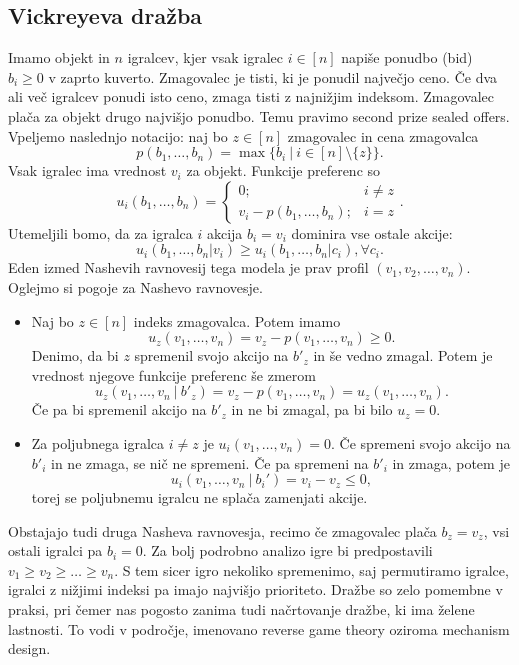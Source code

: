 \documentclass[10pt, a4paper]{article}
\begin{document}
\subsection{Vickreyeva dražba}

Imamo objekt in $n$ igralcev, kjer vsak igralec $i \in [n]$ napiše ponudbo (bid) $b_i \geq 0$ v zaprto kuverto.
Zmagovalec je tisti, ki je ponudil največjo ceno. Če dva ali več igralcev ponudi isto ceno, zmaga tisti z najnižjim 
indeksom. Zmagovalec plača za objekt drugo najvišjo ponudbo. Temu pravimo second prize sealed offers.
Vpeljemo naslednjo notacijo: naj bo $z \in [n]$ zmagovalec in cena zmagovalca
$$p(b_1, \dots, b_n) = \max \{b_i\ |\ i \in [n] \setminus \{z\}\}.$$
Vsak igralec ima vrednost $v_i$ za objekt. Funkcije preferenc so 
$$u_i (b_1, \dots, b_n) = \begin{cases}
  0; & i \neq z\\
  v_i - p(b_1, \dots, b_n); & i = z
\end{cases}.$$
Utemeljili bomo, da za igralca $i$ akcija $b_i = v_i$ dominira vse ostale akcije:
$$u_i (b_1, \dots, b_n | v_i) \geq u_i (b_1, \dots, b_n | c_i), \forall c_i.$$
Eden izmed Nashevih ravnovesij tega modela je prav profil $(v_1, v_2, \dots, v_n)$.
Oglejmo si pogoje za Nashevo ravnovesje.
\begin{itemize}
  \item Naj bo $z \in [n]$ indeks zmagovalca. Potem imamo 
  $$u_z(v_1, \dots, v_n) = v_z - p(v_1, \dots, v_n) \geq 0.$$
  Denimo, da bi $z$ spremenil svojo akcijo na $b'_z$ in še vedno zmagal. Potem je vrednost njegove funkcije preferenc še zmerom 
  $$u_z(v_1, \dots, v_n\ |\ b'_z) = v_z - p(v_1, \dots, v_n) = u_z (v_1, \dots, v_n).$$
  Če pa bi spremenil akcijo na $b'_z$ in ne bi zmagal, pa bi bilo $u_z = 0$.
  \item Za poljubnega igralca $i \neq z$ je $u_i(v_1, \dots, v_n) = 0$.
  Če spremeni svojo akcijo na $b'_i$ in ne zmaga, se nič ne spremeni.
  Če pa spremeni na $b'_i$ in zmaga, potem je 
  $$u_i (v_1, \dots, v_n\ |\ b_i') = v_i - v_z \leq 0,$$
  torej se poljubnemu igralcu ne splača zamenjati akcije.
\end{itemize}
Obstajajo tudi druga Nasheva ravnovesja, recimo če zmagovalec plača $b_z = v_z$,
vsi ostali igralci pa $b_i = 0$. Za bolj podrobno analizo igre bi predpostavili 
$v_1 \geq v_2 \geq \dots \geq v_n$. S tem sicer igro nekoliko spremenimo, saj permutiramo igralce,
igralci z nižjimi indeksi pa imajo najvišjo prioriteto.
Dražbe so zelo pomembne v praksi, pri čemer nas pogosto zanima tudi načrtovanje dražbe, ki ima želene lastnosti.
To vodi v področje, imenovano reverse game theory oziroma mechanism design.
\end{document}
